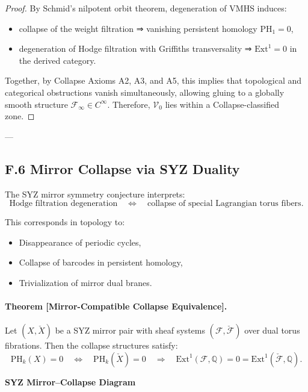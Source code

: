 \documentclass[11pt]{article}
\begin{document}
\begin{proof}
By Schmid’s nilpotent orbit theorem, degeneration of VMHS induces:
\begin{itemize}
  \item collapse of the weight filtration ⇒ vanishing persistent homology \( \mathrm{PH}_1 = 0 \),
  \item degeneration of Hodge filtration with Griffiths transversality ⇒ \( \mathrm{Ext}^1 = 0 \) in the derived category.
\end{itemize}
Together, by Collapse Axioms A2, A3, and A5, this implies that topological and categorical obstructions vanish simultaneously,  
allowing gluing to a globally smooth structure \( \mathcal{F}_\infty \in C^\infty \).  
Therefore, \( \mathcal{V}_0 \) lies within a Collapse-classified zone.
\end{proof}

---

\subsection*{F.6 Mirror Collapse via SYZ Duality}

The SYZ mirror symmetry conjecture interprets:
\[
\text{Hodge filtration degeneration}
\quad \Leftrightarrow \quad
\text{collapse of special Lagrangian torus fibers}.
\]

This corresponds in topology to:

\begin{itemize}
  \item Disappearance of periodic cycles,
  \item Collapse of barcodes in persistent homology,
  \item Trivialization of mirror dual branes.
\end{itemize}

\paragraph{Theorem [Mirror-Compatible Collapse Equivalence].}
Let $(X, \check{X})$ be a SYZ mirror pair with sheaf systems $(\mathcal{F}, \check{\mathcal{F}})$ over dual torus fibrations.  
Then the collapse structures satisfy:
\[
\mathrm{PH}_k(X) = 0 \quad \Leftrightarrow \quad \mathrm{PH}_k(\check{X}) = 0
\quad \Rightarrow \quad
\mathrm{Ext}^1(\mathcal{F}, \mathbb{Q}) = 0 = \mathrm{Ext}^1(\check{\mathcal{F}}, \mathbb{Q}).
\]

\vspace{1.5em}
\noindent\textbf{SYZ Mirror–Collapse Diagram}
\end{document}
